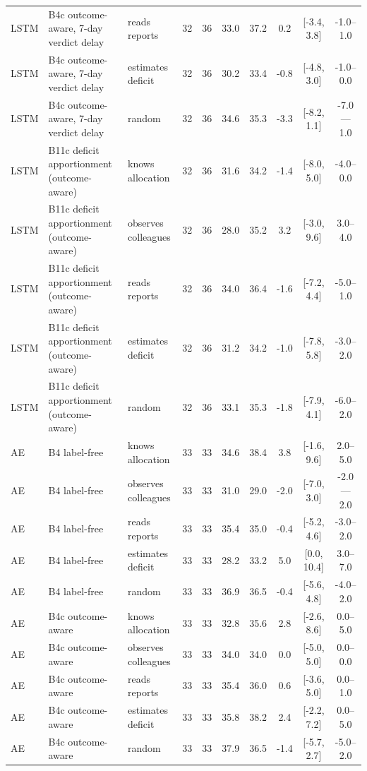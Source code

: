 \begin{table}[!t]
\begin{tabular}{lllccccccc}
LSTM & B4c outcome-aware, 7-day verdict delay & reads reports & 32 & 36 & 33.0 & 37.2 & 0.2 & [-3.4, 3.8] & -1.0--1.0 \\
LSTM & B4c outcome-aware, 7-day verdict delay & estimates deficit & 32 & 36 & 30.2 & 33.4 & -0.8 & [-4.8, 3.0] & -1.0--0.0 \\
LSTM & B4c outcome-aware, 7-day verdict delay & random & 32 & 36 & 34.6 & 35.3 & -3.3 & [-8.2, 1.1] & -7.0---1.0 \\
LSTM & B11c deficit apportionment (outcome-aware) & knows allocation & 32 & 36 & 31.6 & 34.2 & -1.4 & [-8.0, 5.0] & -4.0--0.0 \\
LSTM & B11c deficit apportionment (outcome-aware) & observes colleagues & 32 & 36 & 28.0 & 35.2 & 3.2 & [-3.0, 9.6] & 3.0--4.0 \\
LSTM & B11c deficit apportionment (outcome-aware) & reads reports & 32 & 36 & 34.0 & 36.4 & -1.6 & [-7.2, 4.4] & -5.0--1.0 \\
LSTM & B11c deficit apportionment (outcome-aware) & estimates deficit & 32 & 36 & 31.2 & 34.2 & -1.0 & [-7.8, 5.8] & -3.0--2.0 \\
LSTM & B11c deficit apportionment (outcome-aware) & random & 32 & 36 & 33.1 & 35.3 & -1.8 & [-7.9, 4.1] & -6.0--2.0 \\
AE & B4 label-free & knows allocation & 33 & 33 & 34.6 & 38.4 & 3.8 & [-1.6, 9.6] & 2.0--5.0 \\
AE & B4 label-free & observes colleagues & 33 & 33 & 31.0 & 29.0 & -2.0 & [-7.0, 3.0] & -2.0---2.0 \\
AE & B4 label-free & reads reports & 33 & 33 & 35.4 & 35.0 & -0.4 & [-5.2, 4.6] & -3.0--2.0 \\
AE & B4 label-free & estimates deficit & 33 & 33 & 28.2 & 33.2 & 5.0 & [0.0, 10.4] & 3.0--7.0 \\
AE & B4 label-free & random & 33 & 33 & 36.9 & 36.5 & -0.4 & [-5.6, 4.8] & -4.0--2.0 \\
AE & B4c outcome-aware & knows allocation & 33 & 33 & 32.8 & 35.6 & 2.8 & [-2.6, 8.6] & 0.0--5.0 \\
AE & B4c outcome-aware & observes colleagues & 33 & 33 & 34.0 & 34.0 & 0.0 & [-5.0, 5.0] & 0.0--0.0 \\
AE & B4c outcome-aware & reads reports & 33 & 33 & 35.4 & 36.0 & 0.6 & [-3.6, 5.0] & 0.0--1.0 \\
AE & B4c outcome-aware & estimates deficit & 33 & 33 & 35.8 & 38.2 & 2.4 & [-2.2, 7.2] & 0.0--5.0 \\
AE & B4c outcome-aware & random & 33 & 33 & 37.9 & 36.5 & -1.4 & [-5.7, 2.7] & -5.0--2.0 \\

\end{tabular}
\end{table}
